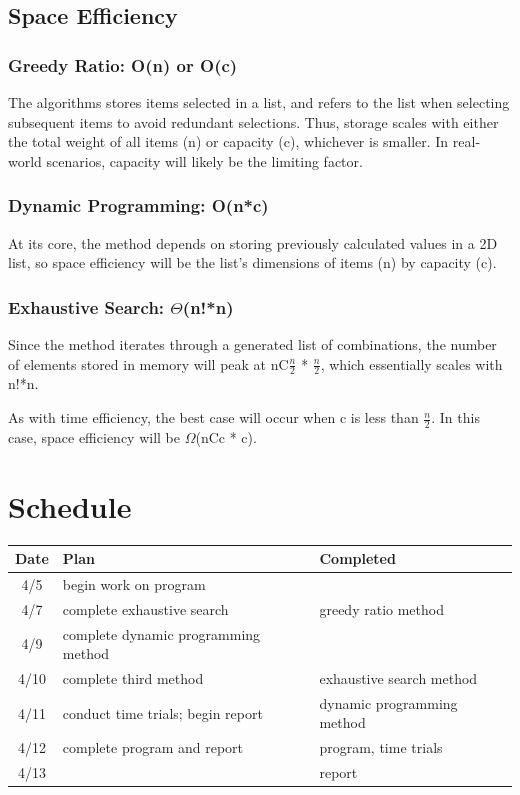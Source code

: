 \documentclass{article}
\begin{document}
\subsection{Space Efficiency}
\subsubsection[Greedy Ratio]{Greedy Ratio: O(n) or O(c)}
\hspace{\parindent}The algorithms stores items selected in a list, and refers to the list when selecting subsequent items to avoid redundant selections. Thus, storage scales with either the total weight of all items (n) or capacity (c), whichever is smaller. In real-world scenarios, capacity will likely be the limiting factor.
\subsubsection[Dynamic Programming]{Dynamic Programming: O(n*c)}
\hspace{\parindent}At its core, the method depends on storing previously calculated values in a 2D list, so space efficiency will be the list's dimensions of items (n) by capacity (c).
\subsubsection[Exhaustive Search]{Exhaustive Search: {\boldmath$\Theta$}(n!*n)}
\hspace{\parindent}Since the method iterates through a generated list of combinations, the number of elements stored in memory will peak at nC$\frac{n}{2}$ * $\frac{n}{2}$, which essentially scales with n!*n.

As with time efficiency, the best case will occur when c is less than $\frac{n}{2}$. In this case, space efficiency will be $\Omega$(nCc * c).

\newpage
\section{Schedule}
\begin{table}[H]
    \centering
    \begin{tabular}{c l l}
        Date & Plan & Completed \\ \hline
        4/5 & begin work on program & \\
        4/7 & complete exhaustive search & greedy ratio method\\
        4/9 & complete dynamic programming method & \\
        4/10 & complete third method & exhaustive search method\\
        4/11 & conduct time trials; begin report & dynamic programming method\\
        4/12 & complete program and report & program, time trials\\
        4/13 & & report
    \end{tabular}
\end{table}
\end{document}
